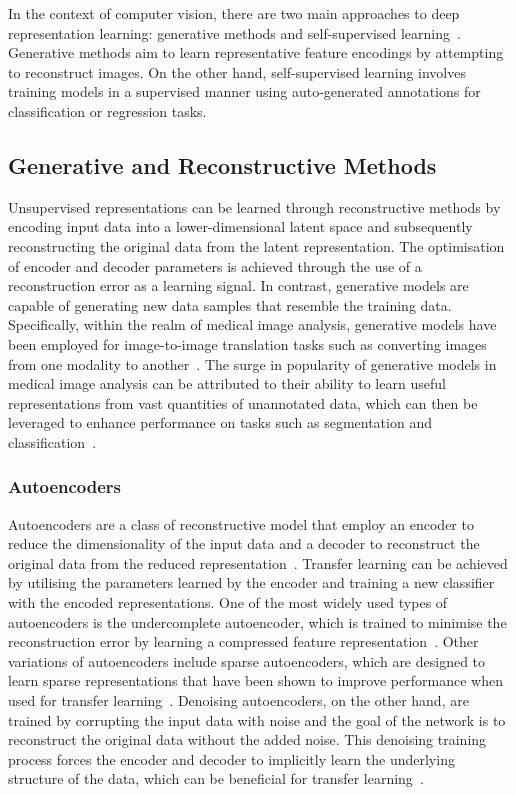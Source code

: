 In the context of computer vision, there are two main approaches to deep representation learning: generative methods and self-supervised learning~\citep{bengio2013representation}. Generative methods aim to learn representative feature encodings by attempting to reconstruct images. On the other hand, self-supervised learning involves training models in a supervised manner using auto-generated annotations for classification or regression tasks.

\subsection{Generative and Reconstructive Methods}
\label{subsec:generative_methods}
Unsupervised representations can be learned through reconstructive methods by encoding input data into a lower-dimensional latent space and subsequently reconstructing the original data from the latent representation. The optimisation of encoder and decoder parameters is achieved through the use of a reconstruction error as a learning signal. In contrast, generative models are capable of generating new data samples that resemble the training data. Specifically, within the realm of medical image analysis, generative models have been employed for image-to-image translation tasks such as converting images from one modality to another~\citep{kaji2019overview}. The surge in popularity of generative models in medical image analysis can be attributed to their ability to learn useful representations from vast quantities of unannotated data, which can then be leveraged to enhance performance on tasks such as segmentation and classification~\citep{yi2019generative}.

\subsubsection{Autoencoders}
\label{subsubsec:autoencoders}
Autoencoders are a class of reconstructive model that employ an encoder to reduce the dimensionality of the input data and a decoder to reconstruct the original data from the reduced representation~\citep{kramer1991nonlinear}. Transfer learning can be achieved by utilising the parameters learned by the encoder and training a new classifier with the encoded representations. One of the most widely used types of autoencoders is the undercomplete autoencoder, which is trained to minimise the reconstruction error by learning a compressed feature representation~\citep{goodfellow2016deep}. Other variations of autoencoders include sparse autoencoders, which are designed to learn sparse representations that have been shown to improve performance when used for transfer learning~\citep{makhzani2013k}. Denoising autoencoders, on the other hand, are trained by corrupting the input data with noise and the goal of the network is to reconstruct the original data without the added noise. This denoising training process forces the encoder and decoder to implicitly learn the underlying structure of the data, which can be beneficial for transfer learning~\citep{bengio2013generalized}.

